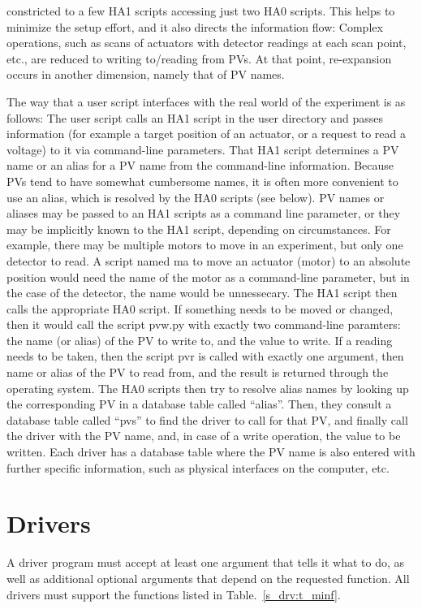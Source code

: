 \documentclass[10pt]{revtex4}
\begin{document}
constricted to a few HA1 scripts accessing just two HA0 scripts.
This helps to minimize the setup effort, and it also directs the
information flow: Complex operations, such as scans of actuators with
detector readings at each scan point, etc., are reduced to writing
to/reading from PVs.
At that point, re-expansion occurs in another dimension, namely that of
PV names.
\par
The way that a user script interfaces with the real world of the
experiment is as follows:
The user script calls an HA1 script in the user directory and passes
information (for example a target position of an actuator, or a
request to read a voltage) to it via command-line parameters.
That HA1 script determines a PV name or an alias for a PV name
from the command-line information.
Because PVs tend to have somewhat cumbersome names, it is often more
convenient to use an alias, which is resolved by the HA0 scripts (see
below).
PV names or aliases may be passed to an HA1 scripts as a command line
parameter, or they may be implicitly known to the HA1 script,
depending on circumstances.
For example, there may be multiple motors to move in an experiment,
but only one detector to read.
A script named ma to move an actuator (motor) to an
absolute position would need the name of the motor as a command-line
parameter, but in the case of the detector, the name would 
be unnessecary.
The HA1 script then calls the appropriate HA0 script.
If something needs to be moved or changed, then it would call the
script pvw.py with exactly two command-line paramters: the name (or
alias) of the PV to write to, and the value to write.
If a reading needs to be taken, then the script pvr is called with
exactly one argument, then name or alias of the PV to read from, and
the result is returned through the operating system.
The HA0 scripts then try to resolve alias names by looking up the
corresponding PV in a database table called ``alias''.
Then, they consult a database table called ``pvs'' to find the driver
to call for that PV, and finally call the driver with the PV name,
and, in case of a write operation, the value to be written.
Each driver has a database table where the PV name is also entered
with further specific information, such as physical interfaces on the
computer, etc.
\section{Drivers}
\label{s_drv}
A driver program must accept at least one argument that tells it what
to do, as well as additional optional arguments that depend on the
requested function.
All drivers must support the functions listed in Table.\
\ref{s_drv:t_minf}.
\end{document}
